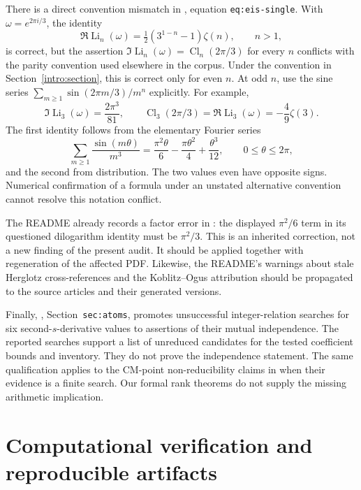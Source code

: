 \documentclass[11pt,a4paper]{article}
\DeclareMathOperator{\Li}{Li}
\theoremstyle{definition}
\theoremstyle{remark}
\numberwithin{equation}{section}
\begin{document}
There is a direct convention mismatch in
, equation
\texttt{eq:eis-single}. With $\omega=e^{2\pi i/3}$, the identity
\[
 \Re\Li_n(\omega)=\tfrac12(3^{1-n}-1)\zeta(n),\qquad n>1,
\]
is correct, but the assertion
$\Im\Li_n(\omega)=\operatorname{Cl}_n(2\pi/3)$ for every $n$
conflicts with the parity convention used elsewhere in the corpus.
Under the convention in Section~\ref{intro:section}, this is correct
only for even $n$. At odd $n$, use the sine series
$\sum_{m\geq1}\sin(2\pi m/3)/m^n$ explicitly. For example,
\begin{equation}\label{audit:clausen-three}
 \Im\Li_3(\omega)=\frac{2\pi^3}{81},
 \qquad
 \operatorname{Cl}_3(2\pi/3)=\Re\Li_3(\omega)
                         =-\frac49\zeta(3).
\end{equation}
The first identity follows from the elementary Fourier series
\[
 \sum_{m\geq1}\frac{\sin(m\theta)}{m^3}
 =\frac{\pi^2\theta}{6}-\frac{\pi\theta^2}{4}
                         +\frac{\theta^3}{12},
 \qquad 0\leq\theta\leq2\pi,
\]
and the second from distribution. The two values even have opposite
signs. Numerical confirmation of a formula under an unstated
alternative convention cannot resolve this notation conflict.

The README already records a factor error in :
the displayed $\pi^2/6$ term in its questioned dilogarithm identity
must be $\pi^2/3$. This is an inherited correction, not a new finding
of the present audit. It should be applied together with regeneration
of the affected PDF. Likewise, the README's warnings about stale
Herglotz cross-references and the Koblitz--Ogus attribution should be
propagated to the source articles and their generated versions.

Finally, ,
Section~\texttt{sec:atoms}, promotes unsuccessful integer-relation
searches for six second-$s$-derivative values to assertions of their
mutual independence. The reported searches support a list of
unreduced candidates for the tested coefficient bounds and inventory.
They do not prove the independence statement. The same qualification
applies to the CM-point non-reducibility claims in
 when their evidence is a
finite search. Our formal rank theorems do not supply the missing
arithmetic implication.

\section{Computational verification and reproducible artifacts}
\label{verification:section}
\end{document}
